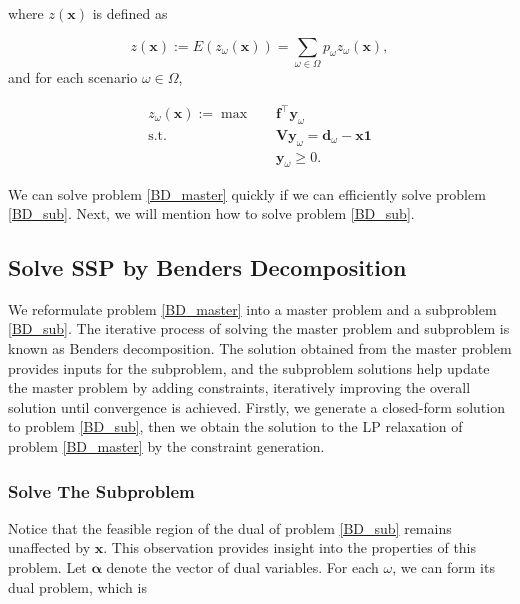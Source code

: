 where $z(\mathbf{x})$ is defined as

$$z(\mathbf{x}) := E(z_{\omega}(\mathbf{x})) = \sum_{\omega \in \Omega} p_{\omega} z_{\omega}(\mathbf{x}),$$ and for each scenario $\omega \in \Omega$, 

\begin{equation}\label{BD_sub}
  \begin{aligned}
    z_{\omega}(\mathbf{x}) := \max \quad & \mathbf{f}^{\intercal} \mathbf{y}_{\omega} \\
    \text {s.t.} \quad & \mathbf{V} \mathbf{y}_{\omega} = \mathbf{d}_{\omega} - \mathbf{x} \mathbf{1} \\
     & \mathbf{y}_{\omega} \geq 0.
  \end{aligned}
\end{equation}


We can solve problem \eqref{BD_master} quickly if we can efficiently solve problem \eqref{BD_sub}. Next, we will mention how to solve problem \eqref{BD_sub}.

\subsection{Solve SSP by Benders Decomposition}\label{solve_by_benders}
We reformulate problem \eqref{BD_master} into a master problem and a subproblem \eqref{BD_sub}. The iterative process of solving the master problem and subproblem is known as Benders decomposition. 
The solution obtained from the master problem provides inputs for the subproblem, and the subproblem solutions help update the master problem by adding constraints, iteratively improving the overall solution until convergence is achieved. Firstly, we generate a closed-form solution to problem \eqref{BD_sub}, then we obtain the solution to the LP relaxation of problem \eqref{BD_master} by the constraint generation.

\subsubsection{Solve The Subproblem}\label{second_stage}

Notice that the feasible region of the dual of problem \eqref{BD_sub} remains unaffected by $\mathbf{x}$. This observation provides insight into the properties of this problem. Let $\bm{\alpha}$ denote the vector of dual variables. For each $\omega$, we can form its dual problem, which is 

